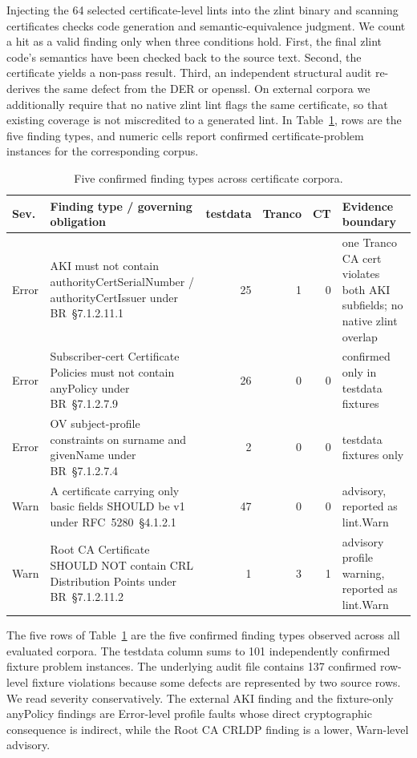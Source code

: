 Injecting the 64 selected certificate-level lints into the zlint binary and scanning
certificates checks code generation and semantic-equivalence judgment. We count a hit as a
valid finding only when three conditions hold. First, the final zlint code's
semantics have been checked back to the source text. Second, the certificate
yields a non-pass result. Third, an independent structural audit re-derives the
same defect from the DER or openssl. On external corpora we additionally require
that no native zlint lint flags the same certificate, so that existing coverage is
not miscredited to a generated lint. In Table~\ref{tab:certfind}, rows are
the five finding types, and numeric cells report confirmed certificate-problem
instances for the corresponding corpus.

\begin{table}[tb]
\centering
\scriptsize
\setlength{\tabcolsep}{4pt}
\caption{Five confirmed finding types across certificate corpora.}
\label{tab:certfind}
\begin{tabularx}{\textwidth}{@{}l X r r r p{3.3cm}@{}}
\toprule
Sev. & Finding type / governing obligation & testdata & Tranco & CT &
  Evidence boundary \\
\midrule
Error & AKI must not contain authorityCertSerialNumber / authorityCertIssuer
  under BR~\S7.1.2.11.1 & 25 & 1 & 0 & one Tranco CA cert violates both AKI
  subfields; no native zlint overlap \\
Error & Subscriber-cert Certificate Policies must not contain anyPolicy
  under BR~\S7.1.2.7.9 & 26 & 0 & 0 & confirmed only in testdata fixtures \\
Error & OV subject-profile constraints on surname and givenName
  under BR~\S7.1.2.7.4 & 2 & 0 & 0 &
  testdata fixtures only \\
Warn & A certificate carrying only basic fields SHOULD be v1
  under RFC~5280~\S4.1.2.1 & 47 & 0 & 0 & advisory, reported as lint.Warn \\
Warn & Root CA Certificate SHOULD NOT contain CRL Distribution Points
  under BR~\S7.1.2.11.2 & 1 & 3 & 1 & advisory profile warning, reported as lint.Warn \\
\bottomrule
\end{tabularx}
\end{table}

The five rows of Table~\ref{tab:certfind} are the five confirmed finding types
observed across all evaluated corpora. The testdata column sums to 101
independently confirmed fixture problem instances. The underlying audit file
contains 137 confirmed row-level fixture violations because some defects are
represented by two source rows. We read severity conservatively.
The external AKI finding and the fixture-only anyPolicy findings are Error-level
profile faults whose direct cryptographic consequence is indirect, while the Root
CA CRLDP finding is a lower, Warn-level advisory.

